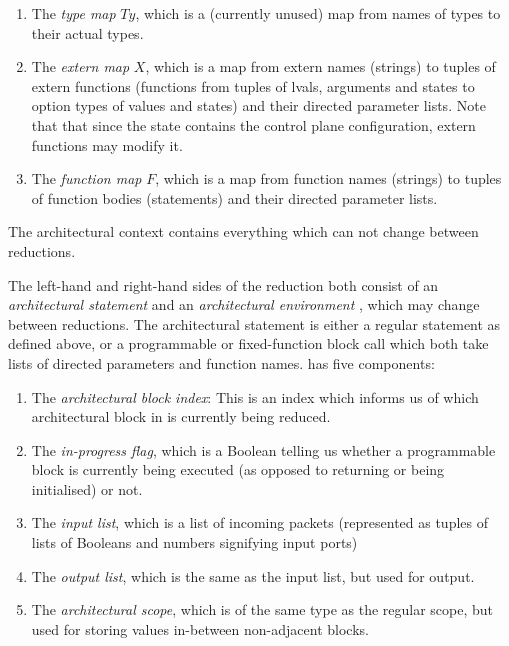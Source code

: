 \documentclass[UTF8]{article}
\begin{document}
\begin{enumerate}
\item The \emph{type map} $\mathit{Ty}$, which is a (currently unused) map from names of types to their actual types.
\item The \emph{extern map} $X$, which is a map from extern names (strings) to tuples of extern functions (functions from tuples of lvals, arguments and states to option types of values and states) and their directed parameter lists. Note that that since the state contains the control plane configuration, extern functions may modify it.
\item The \emph{function map} $F$, which is a map from function names (strings) to tuples of function bodies (statements) and their directed parameter lists.
\end{enumerate}
The architectural context contains everything which can not change between reductions.

The left-hand and right-hand sides of the reduction both consist of an \emph{architectural statement} and an \emph{architectural environment} \aenv{}, which may change between reductions. The architectural statement is either a regular statement as defined above, or a programmable or fixed-function block call which both take lists of directed parameters and function names. \aenv has five components:
\begin{enumerate}
\item The \emph{architectural block index}: This is an index which informs us of which architectural block in \abl{} is currently being reduced.
\item The \emph{in-progress flag}, which is a Boolean telling us whether a programmable block is currently being executed (as opposed to returning or being initialised) or not.
\item The \emph{input list}, which is a list of incoming packets (represented as tuples of lists of Booleans and numbers signifying input ports)
\item The \emph{output list}, which is the same as the input list, but used for output.
\item The \emph{architectural scope}, which is of the same type as the regular scope, but used for storing values in-between non-adjacent blocks.
\end{enumerate}
\end{document}
